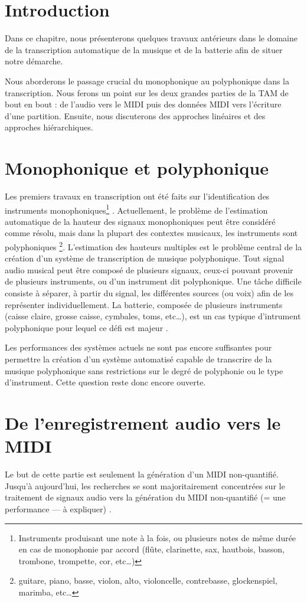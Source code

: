 \section*{Introduction}
Dans ce chapitre, nous présenterons quelques travaux antérieurs dans le domaine
de la transcription automatique de la musique et de la batterie afin de situer
notre démarche.

Nous aborderons le passage crucial du monophonique au polyphonique dans la
transcription. Nous ferons un point sur les deux grandes parties de la TAM de
bout en bout : de l’audio vers le MIDI puis des données MIDI vers l’écriture
d’une partition. Ensuite, nous discuterons des approches linéaires et des
approches hiérarchiques.

\section{Monophonique et polyphonique}
Les premiers travaux en transcription ont été faits sur l’identification des
instruments monophoniques\footnote{Instruments produisant une note à la fois,
ou plusieurs notes de même durée en cas de monophonie par accord (flûte,
clarinette, sax, hautbois, basson, trombone, trompette, cor, etc…)}
\cite{future_directions}. Actuellement, le problème de l'estimation automatique
de la hauteur des signaux monophoniques peut être considéré comme résolu, mais
dans la plupart des contextes musicaux, les instruments sont polyphoniques
\footnote{guitare, piano, basse, violon, alto, violoncelle, contrebasse,
glockenspiel, marimba, etc…}. L'estimation des hauteurs multiples est le
problème central de la création d'un système de transcription de musique
polyphonique. Tout signal audio musical peut être composé de plusieurs signaux,
ceux-ci pouvant provenir de plusieurs instruments, ou d'un instrument dit
polyphonique. Une tâche difficile consiste à séparer, à partir du signal, les
différentes sources (ou voix) afin de les représenter individuellement. La
batterie, composée de plusieurs instruments (caisse claire, grosse caisse,
cymbales, toms, etc…), est un cas typique d'intrument polyphonique pour lequel
ce défi est majeur .

Les performances des systèmes actuels ne sont pas encore suffisantes pour
permettre la création d'un système automatisé capable de transcrire de la
musique polyphonique sans restrictions sur le degré de polyphonie ou le type
d'instrument. Cette question reste donc encore ouverte. 

\section{De l’enregistrement audio vers le MIDI}
\label{audio_to_midi}
Le but de cette partie est seulement la génération d’un MIDI non-quantifié.\\
Jusqu’à aujourd’hui, les recherches se sont majoritairement concentrées sur le
traitement de signaux audio vers la génération du MIDI non-quantifié (= une
performance — à expliquer) \cite{AMT_for_2_Instru}.\\

